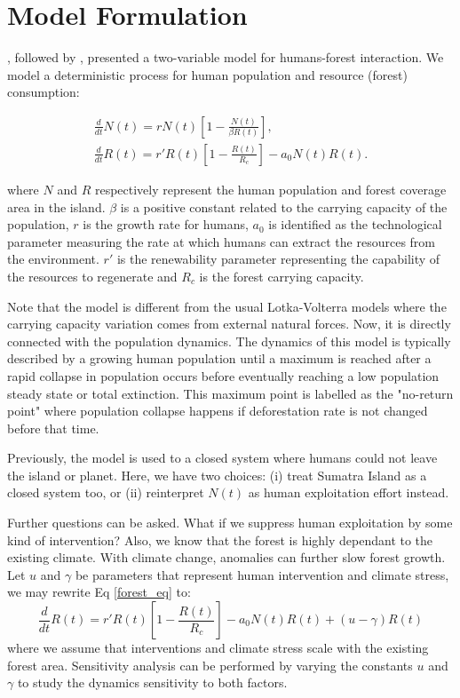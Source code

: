 \documentclass[12pt,a4paper]{article}
\begin{document}
\section{Model Formulation}
\cite{bologna2008simple}, followed by \cite{bologna2020deforestation}, presented a two-variable model for humans-forest interaction. We model a deterministic process for human population and resource (forest) consumption:

\begin{align}
    \frac{d}{dt} N(t) = r N(t) \left[ 1 - \frac{N(t)}{\beta R(t)} \right], \\
    \frac{d}{dt} R(t) = r' R(t) \left[ 1 - \frac{R(t)}{R_c} \right] - a_0 N(t) R(t). \label{forest_eq}
\end{align}

where $N$ and $R$ respectively represent the human population and forest coverage area in the island. $\beta$ is a positive constant related to the carrying capacity of the population, $r$ is the growth rate for humans, $a_0$ is identified as the technological parameter measuring the rate at which humans can extract the resources from the environment. $r'$ is the renewability parameter representing the capability of the resources to regenerate and $R_c$ is the forest carrying capacity.

Note that the model is different from the usual Lotka-Volterra models where the carrying capacity variation comes from external natural forces. Now, it is directly connected with the population dynamics. The dynamics of this model is typically described by a growing human population until a maximum is reached after a rapid collapse in population occurs before eventually reaching a low population steady state or total extinction. This maximum point is labelled as the "no-return point" where population collapse happens if deforestation rate is not changed before that time.

Previously, the model is used to a closed system where humans could not leave the island or planet. Here, we have two choices: (i) treat Sumatra Island as a closed system too, or (ii) reinterpret $N(t)$ as human exploitation effort instead.

Further questions can be asked. What if we suppress human exploitation by some kind of intervention? Also, we know that the forest is highly dependant to the existing climate. With climate change, anomalies can further slow forest growth. Let $u$ and $\gamma$ be parameters that represent human intervention and climate stress, we may rewrite Eq \eqref{forest_eq} to:
\begin{equation}
    \frac{d}{dt} R(t) = r' R(t) \left[ 1 - \frac{R(t)}{R_c} \right] - a_0 N(t) R(t) + (u - \gamma) R(t)
\end{equation}
where we assume that interventions and climate stress scale with the existing forest area. Sensitivity analysis can be performed by varying the constants $u$ and $\gamma$ to study the dynamics sensitivity to both factors.
\end{document}
